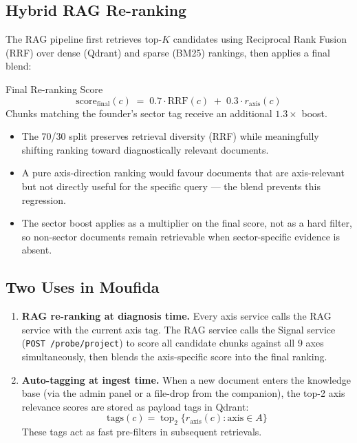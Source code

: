 \documentclass[11pt,a4paper]{article}
\begin{document}
\subsection{Hybrid RAG Re-ranking}

The RAG pipeline first retrieves top-$K$ candidates using Reciprocal Rank Fusion (RRF)
over dense (Qdrant) and sparse (BM25) rankings, then applies a final blend:

\begin{mathbox}{Final Re-ranking Score}
\[
  \text{score}_\text{final}(c) \;=\; 0.7 \cdot \text{RRF}(c) \;+\; 0.3 \cdot r_\text{axis}(c)
\]
Chunks matching the founder's sector tag receive an additional $1.3\times$ boost.
\end{mathbox}

\begin{itemize}
  \item The 70/30 split preserves retrieval diversity (RRF) while meaningfully shifting
        ranking toward diagnostically relevant documents.
  \item A pure axis-direction ranking would favour documents that are axis-relevant but
        not directly useful for the specific query — the blend prevents this regression.
  \item The sector boost applies as a multiplier on the final score, not as a hard filter,
        so non-sector documents remain retrievable when sector-specific evidence is absent.
\end{itemize}

\subsection{Two Uses in Moufida}

\begin{enumerate}
  \item \textbf{RAG re-ranking at diagnosis time.} Every axis service calls the RAG service
        with the current axis tag. The RAG service calls the Signal service
        (\texttt{POST /probe/project}) to score all candidate chunks against all 9 axes
        simultaneously, then blends the axis-specific score into the final ranking.

  \item \textbf{Auto-tagging at ingest time.} When a new document enters the knowledge
        base (via the admin panel or a file-drop from the companion), the top-2 axis
        relevance scores are stored as payload tags in Qdrant:
        \[
          \text{tags}(c) = \mathop{\mathrm{top}}_2\bigl\{r_\text{axis}(c) : \text{axis} \in A\bigr\}
        \]
        These tags act as fast pre-filters in subsequent retrievals.
\end{enumerate}
\end{document}
